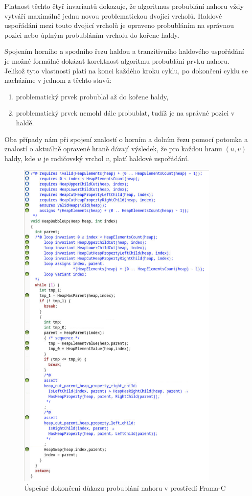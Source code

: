 Platnost těchto čtyř invariantů dokazuje, že algoritmus probublání nahoru vždy vytváří maximálně jednu novou problematickou dvojici vrcholů. Haldové uspořádání mezi touto dvojicí vrcholů je opraveno probubláním na správnou pozici nebo úplným probubláním vrcholu do kořene haldy.

Spojením horního a spodního řezu haldou a tranzitivního haldového uspořádání je možné formálně dokázat korektnost algoritmu probublání prvku nahoru. Jelikož tyto vlastnosti platí na konci každého kroku cyklu, po dokončení cyklu se nacházíme v jednom z těchto stavů:

\begin{enumerate}
  \item problematický prvek probublal až do kořene haldy,
  \item problematický prvek nemohl dále probublat, tudíž je na správné pozici v haldě.
\end{enumerate}

Oba případy nám při spojení znalostí o horním a dolním řezu pomocí potomka a znalostí o aktuálně opravené hraně dávají výsledek, že pro každou hranu $(u, v)$ haldy, kde $u$ je rodičovský vrchol $v$, platí haldové uspořádání.

\begin{figure}[H]
	\centering
	\includegraphics[width=10cm]{images/frama-c-HeapBubbleUp}
	\caption{Úspešné dokončení důkazu probublání nahoru v prostředí Frama-C}
	\label{img:F-C-HeapBubbleUp}
\end{figure}

